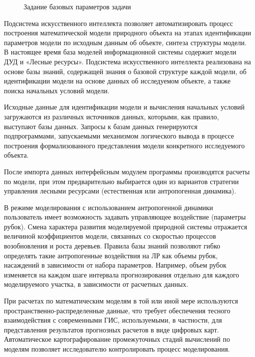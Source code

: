 \begin{figure}
\caption{Задание базовых параметров задачи}\label{pic:basic_task_params}
\end{figure}

Подсистема искусственного интеллекта позволяет
автоматизировать процесс построения математической
модели природного объекта на этапах идентификации
параметров модели по исходным данным об объекте,
синтеза структуры модели. В настоящее время
база моделей информационной системы содержит
модели ДУД и «Лесные ресурсы». Подсистема искусственного
интеллекта реализована на основе базы знаний,
содержащей знания о базовой структуре каждой
модели, об идентификации модели на основе данных
об исследуемом объекте, а также поиска начальных
условий модели.

Исходные данные для идентификации модели и
вычисления начальных условий загружаются из
различных источников данных, которыми, как
правило, выступают базы данных. Запросы к базам
данных генерируются подпрограммами, запускаемыми
механизмом логического вывода в процессе построения
формализованного представления модели конкретного
исследуемого объекта.

После импорта данных интерфейсным модулем
программы производятся расчеты по модели, при
этом предварительно выбирается один из вариантов
стратегии управления лесными ресурсами (естественная
или антропогенная динамика).

В режиме моделирования с использованием антропогенной
динамики пользователь имеет возможность задавать
управляющее воздействие (параметры рубок).
Смена характера развития моделируемой природной
системы отражается величиной коэффициентов
модели, связанных со скоростью процессов возобновления
и роста деревьев. Правила базы знаний позволяют
гибко определять такие антропогенные воздействия
на ЛР как объемы рубок, насаждений в зависимости
от набора параметров. Например, объем рубок
изменяется на каждом шаге интервала прогнозирования
отдельно для каждого моделируемого участка,
в зависимости от расчетных данных.

При расчетах по математическим моделям в той
или иной мере используются пространственно-распределенные
данные, что требует обеспечения тесного взаимодействия
с современными ГИС, используемыми, в частности,
для представления результатов прогнозных расчетов
в виде цифровых карт. Автоматическое картографирование
промежуточных стадий вычислений по моделям
позволяет исследователю контролировать процесс
моделирования.

